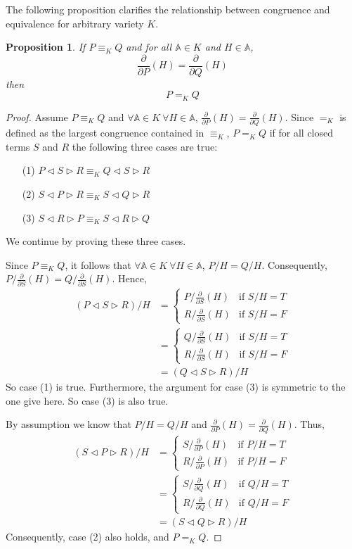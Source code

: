 \documentclass[a4paper,twoside,openright]{report}
\newcommand{\dd}[1]{\frac{\partial}{\partial #1}}
\newcommand{\lef}{\ensuremath{\triangleleft}}
\newcommand{\rig}{\ensuremath{\triangleright}}
\newtheorem{prop}[theorem]{Proposition}
\begin{document}
The following proposition clarifies the relationship between congruence and equivalence for arbitrary variety $K$.
\begin{prop}\label{equiv congr prop}
If $P\equiv_KQ$ and for all $\mathbb{A}\in K$ and $H\in\mathbb{A}$, 
\[
\dd P(H)=\dd Q(H)
\]
then
\[
P=_KQ
\]
\end{prop}
\begin{proof}
Assume $P\equiv_KQ$ and $\forall\mathbb{A}\in K~\forall H\in\mathbb{A}$, $\dd P(H)=\dd Q(H)$. Since $=_K$ is defined as the largest congruence contained in $\equiv_K$, $P=_KQ$ if for all closed terms $S$ and $R$ the following three cases are true:
\begin{itemize}
\item[(1)] $P\lef S\rig R\equiv_K Q\lef S\rig R$
\item[(2)] $S\lef P\rig R\equiv_K S\lef Q\rig R$
\item[(3)] $S\lef R\rig P\equiv_K S\lef R\rig Q$
\end{itemize}
We continue by proving these three cases.

Since $P\equiv_KQ$, it follows that $\forall\mathbb{A}\in K~\forall H\in\mathbb{A}$, $P/H=Q/H$. Consequently, $P/\dd S(H)=Q/\dd S(H)$. Hence,
\begin{align*}
(P\lef S\rig R)/H
&=\begin{cases}
P/\dd S(H) & \text{if $S/H=T$}\\
R/\dd S(H) & \text{if $S/H=F$}
\end{cases}\\
&=\begin{cases}
Q/\dd S(H) & \text{if $S/H=T$}\\
R/\dd S(H) & \text{if $S/H=F$}
\end{cases}\\
&=(Q\lef S\rig R)/H
\end{align*}
So case (1) is true. Furthermore, the argument for case (3) is symmetric to the one give here. So case (3) is also true.

By assumption we know that $P/H=Q/H$ and $\dd P(H)=\dd Q(H)$. Thus,
\begin{align*}
(S\lef P\rig R)/H
&=\begin{cases}
S/\dd P(H) & \text{if $P/H=T$}\\
R/\dd P(H) & \text{if $P/H=F$}
\end{cases}\\
&=\begin{cases}
S/\dd Q(H) & \text{if $Q/H=T$}\\
R/\dd Q(H) & \text{if $Q/H=F$}
\end{cases}\\
&=(S\lef Q\rig R)/H
\end{align*}
Consequently, case (2) also holds, and $P=_KQ$.
\end{proof}
\end{document}
